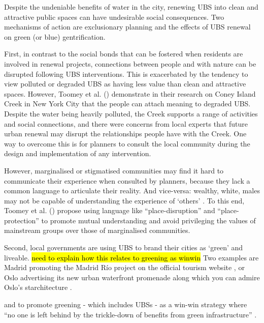 \documentclass{article}
\begin{document}
Despite the undeniable benefits of water in the city, renewing UBS into clean and attractive public spaces can have undesirable social consequences.
Two mechanisms of action are exclusionary planning and the effects of UBS renewal on green (or blue) gentrification. 

First, in contrast to the social bonds that can be fostered when residents are involved in renewal projects, connections between people and with nature can be disrupted following UBS interventions. 
This is exacerbated by the tendency to view polluted or degraded UBS as having less value than clean and attractive spaces. 
However, Toomey et al. (\citeyear{toomey2021place}) demonstrate in their research on Coney Island Creek in New York City that the people can attach meaning to degraded UBS. Despite the water being heavily polluted, the Creek supports a range of activities and social connections, and there were concerns from local experts that future urban renewal may disrupt the relationships people have with the Creek. One way to overcome this is for planners to consult the local community during the design and implementation of any intervention.

However, marginalised or stigmatised communities may find it hard to communicate their experience when consulted by planners, because they lack a common language to articulate their reality. And vice-versa: wealthy, white, males may not be capable of understanding the experience of `others' \parencite{anguelovski2020expanding}. To this end, Toomey et al. (\citeyear{toomey2021place}) propose using language like ``place-disruption'' and ``place-protection'' to promote mutual understanding and avoid privileging the values of mainstream groups over those of marginalised communities.

Second, local governments are using UBS to brand their cities as `green' and liveable.
\hl{need to explain how this relates to greening as winwin} Two examples are Madrid promoting the Madrid Río project on the official tourism website \parencite{madridrio}, or Oslo advertising its new urban waterfront promenade along which you can admire Oslo's starchitecture \parencite{visitoslo}.


 and to promote greening - which includes UBSs - as a win-win strategy where ``no one is left behind by the trickle-down of benefits from green infrastructure'' \parencite{anguelovski2021green}. 
\end{document}
